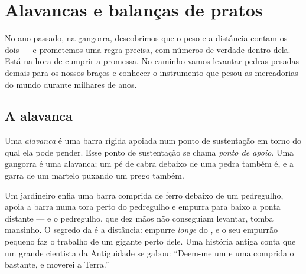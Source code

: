 \chapter{Alavancas e balanças de pratos}\label{ch:g3:levers-and-scales}

No ano passado, na gangorra, descobrimos que o peso e a distância
contam os dois --- e prometemos uma regra precisa, com números de
verdade dentro dela. Está na hora de cumprir a promessa. No caminho
vamos levantar pedras pesadas demais para os nossos braços e conhecer
o instrumento que pesou as mercadorias do mundo durante milhares de
anos.

\section{A alavanca}

\begin{definition}\label{def:g3:levers-and-scales:lever}
Uma \emph{alavanca} é uma barra rígida apoiada num
ponto de sustentação em torno do qual ela pode pender. Esse ponto de
sustentação se chama \emph{ponto de apoio}. Uma
gangorra é uma alavanca; um pé de cabra debaixo de uma pedra também
é, e a garra de um martelo puxando um prego também.
\end{definition}

\begin{example}\label{ex:g3:levers-and-scales:crowbar}
Um jardineiro enfia uma barra comprida de ferro debaixo de um
pedregulho, apoia a barra numa tora perto do pedregulho e empurra
para baixo a ponta distante --- e o pedregulho, que dez mãos não
conseguiam levantar, tomba mansinho. O segredo da  é a
distância: empurre \emph{longe} do , e o seu empurrão
pequeno faz o trabalho de um gigante perto dele. Uma história antiga
conta que um grande cientista da Antiguidade se gabou: ``Deem-me um
 e uma  comprida o bastante, e moverei a
Terra.''
\end{example}

